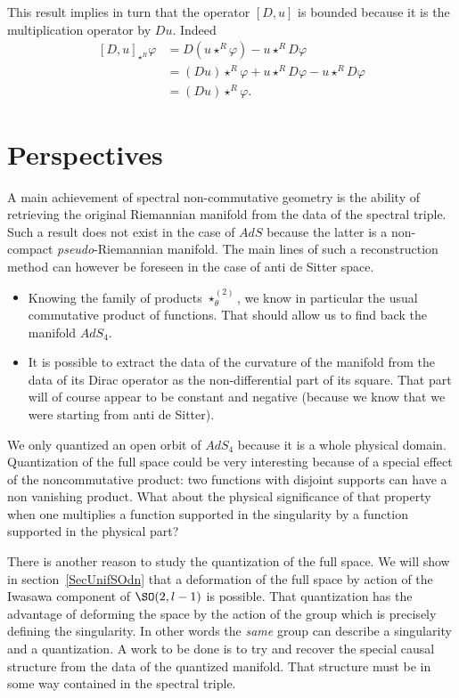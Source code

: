 This result implies in turn that the operator $[D,u]$ is bounded because it is the multiplication operator by $Du$. Indeed
\[
\begin{split}
  [D,u]_{\star^R}\varphi
        &=D(u\star^R \varphi)-u\star^R D\varphi\\
        &= (Du)\star^R\varphi+u\star^R D\varphi-u\star^R D\varphi\\
        &=(Du)\star^R\varphi.
\end{split}
\]

\section{Perspectives}

A main achievement of spectral non-commutative geometry is the ability of retrieving the original Riemannian manifold from the data of the spectral triple. Such a result does not exist in the case of $AdS$ because the latter is a non-compact \emph{pseudo}-Riemannian manifold. The main lines of such a reconstruction method can however be foreseen in the case of anti de Sitter space.
\begin{itemize}
\item Knowing the family of products $\star^{(2)}_{\theta}$, we know in particular the usual commutative product of functions. That should allow us to find back the manifold $AdS_4$.
\item It is possible to extract the data of the curvature of the manifold from the data of its Dirac operator as the non-differential part of its square. That part will of course appear to be constant and negative (because we know that we were starting from anti de Sitter).
\end{itemize}

We only quantized an open orbit of $AdS_4$ because it is a whole physical domain. Quantization of the full space could be very interesting because of a special effect of the noncommutative product: two functions with disjoint supports can have a non vanishing product. What about the physical significance of that property when one multiplies a function supported in the singularity by a function supported in the physical part?

There is another reason to study the quantization of the full space. We will show in section~\ref{SecUnifSOdn} that a deformation of the full space by action of the Iwasawa component of $\SO(2,l-1)$ is possible. That quantization has the advantage of deforming the space by the action of the group which is precisely defining the singularity. In other words the \emph{same} group can describe a singularity and a quantization. A work to be done is to try and recover the special causal structure from the data of the quantized manifold. That structure must be in some way contained in the spectral triple.


